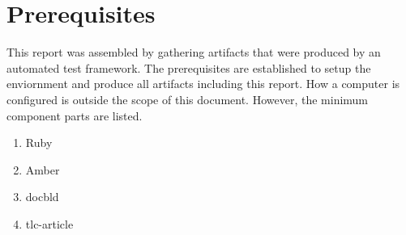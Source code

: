 \section{Prerequisites}
This report was assembled by gathering artifacts that were produced by an
automated test framework.  The prerequisites are established to setup the
enviornment and produce all artifacts including this report.  How a computer is
configured is outside the scope of this document.  However, the minimum
component parts are listed.

\begin{enumerate}

\item Ruby 
\item Amber
\item docbld
\item tlc-article

\end{enumerate}
